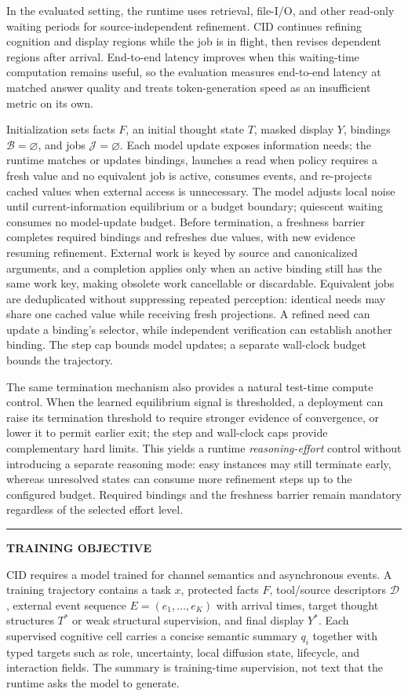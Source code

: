 In the evaluated setting, the runtime uses retrieval, file-I/O, and other read-only waiting periods for source-independent refinement. CID continues refining cognition and display regions while the job is in flight, then revises dependent regions after arrival. End-to-end latency improves when this waiting-time computation remains useful, so the evaluation measures end-to-end latency at matched answer quality and treats token-generation speed as an insufficient metric on its own.

Initialization sets facts $F$, an initial thought state $T$, masked display $Y$, bindings $\mathcal{B}=\varnothing$, and jobs $\mathcal{J}=\varnothing$. Each model update exposes information needs; the runtime matches or updates bindings, launches a read when policy requires a fresh value and no equivalent job is active, consumes events, and re-projects cached values when external access is unnecessary. The model adjusts local noise until current-information equilibrium or a budget boundary; quiescent waiting consumes no model-update budget. Before termination, a freshness barrier completes required bindings and refreshes due values, with new evidence resuming refinement. External work is keyed by source and canonicalized arguments, and a completion applies only when an active binding still has the same work key, making obsolete work cancellable or discardable. Equivalent jobs are deduplicated without suppressing repeated perception: identical needs may share one cached value while receiving fresh projections. A refined need can update a binding's selector, while independent verification can establish another binding. The step cap bounds model updates; a separate wall-clock budget bounds the trajectory.

The same termination mechanism also provides a natural test-time compute control. When the learned equilibrium signal is thresholded, a deployment can raise its termination threshold to require stronger evidence of convergence, or lower it to permit earlier exit; the step and wall-clock caps provide complementary hard limits. This yields a runtime \emph{reasoning-effort} control without introducing a separate reasoning mode: easy instances may still terminate early, whereas unresolved states can consume more refinement steps up to the configured budget. Required bindings and the freshness barrier remain mandatory regardless of the selected effort level.

\medskip
\noindent\rule{\columnwidth}{0.5pt}
\vspace{3pt}
\noindent\textbf{TRAINING OBJECTIVE}\par\vspace{2pt}
CID requires a model trained for channel semantics and asynchronous events. A training trajectory contains a task $x$, protected facts $F$, tool/source descriptors $\mathcal{D}$, external event sequence $E=(e_1,\ldots,e_K)$ with arrival times, target thought structures $T^*$ or weak structural supervision, and final display $Y^*$. Each supervised cognitive cell carries a concise semantic summary $q_i$ together with typed targets such as role, uncertainty, local diffusion state, lifecycle, and interaction fields. The summary is training-time supervision, not text that the runtime asks the model to generate.

